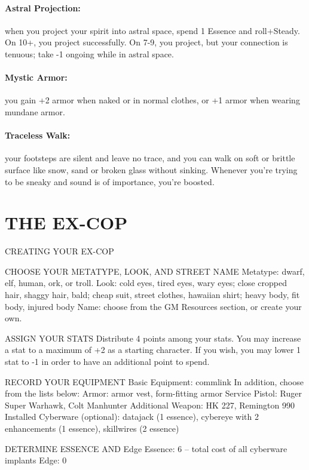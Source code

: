 \paragraph{Astral Projection:} when you project your spirit into astral space, spend 1 Essence and roll+Steady. On 10+, you project successfully. On 7-9, you project, but your connection is tenuous; take -1 ongoing while in astral space.

\paragraph{Mystic Armor:} you gain +2 armor when naked or in normal clothes, or +1 armor when wearing mundane armor.

\paragraph{Traceless Walk:} your footsteps are silent and leave no trace, and you can walk on soft or brittle surface like snow, sand or broken glass without sinking. Whenever you’re trying to be sneaky and sound is of importance, you’re boosted.



\clearpage
\section{THE EX-COP}
CREATING YOUR EX-COP

CHOOSE YOUR METATYPE, LOOK, AND STREET NAME
Metatype: dwarf, elf, human, ork, or troll.
Look: cold eyes, tired eyes, wary eyes; close cropped hair, shaggy hair, bald; cheap suit, street clothes, hawaiian shirt; heavy body, fit body, injured body
Name: choose from the GM Resources section, or create your own.

ASSIGN YOUR STATS
Distribute 4 points among your stats. You may increase a stat to a maximum of +2 as a starting character. If you wish, you may lower 1 stat to -1 in order to have an additional point to spend.

RECORD YOUR EQUIPMENT
Basic Equipment: commlink
In addition, choose from the lists below: Armor: armor vest, form-fitting armor
Service Pistol: Ruger Super Warhawk, Colt Manhunter
Additional Weapon: HK 227, Remington 990
Installed Cyberware (optional): datajack (1 essence), cybereye with 2 enhancements (1 essence), skillwires (2 essence)

DETERMINE ESSENCE AND Edge
Essence: 6 – total cost of all cyberware implants
Edge: 0

